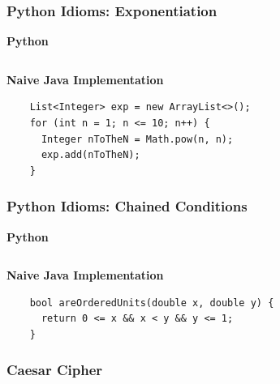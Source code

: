 \documentclass{beamer}
\begin{document}
\begin{frame}[fragile]
  \frametitle{Python Idioms: Exponentiation}
  \textbf{Python}
  \inputminted{python}{exponentiation.py}
  
  \textbf{Naive Java Implementation}
  \begin{lstlisting}
    List<Integer> exp = new ArrayList<>();
    for (int n = 1; n <= 10; n++) {
      Integer nToTheN = Math.pow(n, n);
      exp.add(nToTheN);
    }
  \end{lstlisting}
\end{frame}

\begin{frame}[fragile]
  \frametitle{Python Idioms: Chained Conditions}
  \textbf{Python}
  \inputminted{python}{ordered_units.py}
  
  \textbf{Naive Java Implementation}
  \begin{lstlisting}
    bool areOrderedUnits(double x, double y) {
      return 0 <= x && x < y && y <= 1;
    }
  \end{lstlisting}
\end{frame}
 
\begin{frame}
  \frametitle{Caesar Cipher}
  \inputminted{python}{caesar.py}
\end{frame}
\end{document}
